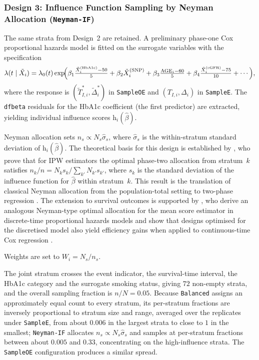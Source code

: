 \subsubsection{Design 3: Influence Function Sampling by Neyman Allocation (\texttt{Neyman-IF})}

The same strata from Design~2 are retained. A preliminary phase-one Cox proportional hazards model is fitted on the surrogate variables with the specification
\begin{equation*}
  \lambda(t \mid \tilde{X}_i) = \lambda_0(t)
    \exp\!\Bigl(
      \beta_1 \tfrac{\tilde{X}_i^{(\mathrm{HbA1c})} - 50}{5}
    + \beta_2 \tilde{X}_i^{(\mathrm{SNP})}
    + \beta_3 \tfrac{\mathrm{AGE}_i - 60}{5}
    + \beta_4 \tfrac{\tilde{X}_i^{(\mathrm{eGFR})} - 75}{10}
    + \cdots
    \Bigr),
\end{equation*}
where the response is $(\tilde{T}_{I,i}^*, \tilde{\Delta}_i^*)$ in \texttt{SampleOE} and $(T_{I,i}, \Delta_i)$ in \texttt{SampleE}. The \texttt{dfbeta} residuals \citep{therneau2000cox} for the HbA1c coefficient (the first predictor) are extracted, yielding individual influence scores $\mathrm{h}_i(\hat{\beta})$.

Neyman allocation sets $n_s \propto N_s \hat{\sigma}_s$, where $\hat{\sigma}_s$ is the within-stratum standard deviation of $\mathrm{h}_i(\hat{\beta})$. The theoretical basis for this design is established by \citet[Section~4.1]{amorim2021two}, who prove that for IPW estimators the optimal phase-two allocation from stratum~$k$ satisfies $n_k / n = N_k s_k \big/ \sum_{k'} N_{k'} s_{k'}$, where $s_k$ is the standard deviation of the influence function for $\hat{\beta}$ within stratum~$k$. This result is the translation of classical Neyman allocation \citep{neyman1938contribution} from the population-total setting to two-phase regression \citep{lumley2011connections, mcisaac2014response}. The extension to survival outcomes is supported by \citet{han2021two}, who derive an analogous Neyman-type optimal allocation for the mean score estimator in discrete-time proportional hazards models and show that designs optimised for the discretised model also yield efficiency gains when applied to continuous-time Cox regression \citep[Tables~3--4]{han2021two}.

Weights are set to $W_i = N_s / n_s$.

The joint stratum crosses the event indicator, the survival-time interval, the HbA1c category and the surrogate smoking status, giving $72$ non-empty strata, and the overall sampling fraction is $n/N = 0.05$. Because \texttt{Balanced} assigns an approximately equal count to every stratum, its per-stratum fractions are inversely proportional to stratum size and range, averaged over the replicates under \texttt{SampleE}, from about $0.006$ in the largest strata to close to $1$ in the smallest; \texttt{Neyman-IF} allocates $n_s \propto N_s \hat{\sigma}_s$ and samples at per-stratum fractions between about $0.005$ and $0.33$, concentrating on the high-influence strata. The \texttt{SampleOE} configuration produces a similar spread.

